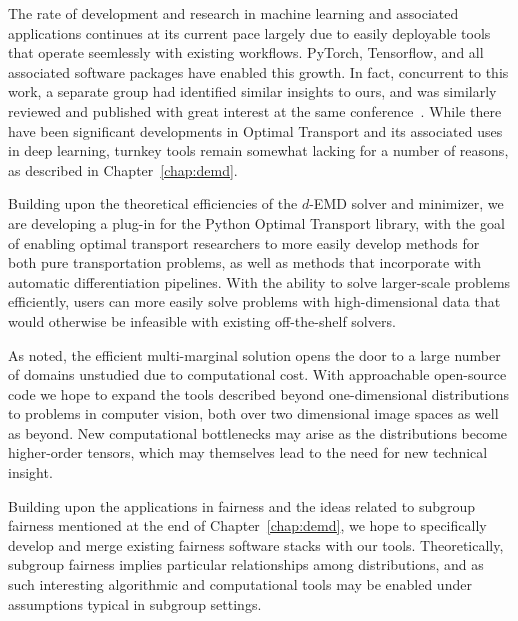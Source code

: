 The rate of development and research in machine learning and associated applications
continues at its current pace
largely due to 
easily deployable tools that
operate seemlessly with existing workflows.
PyTorch, Tensorflow, and all associated software
packages have enabled this growth.
In fact,
concurrent to this work,
a separate group had identified 
similar insights to ours,
and was similarly reviewed and published
with great interest at the same conference~\citep{just2023lava}.
While there have been significant 
developments in Optimal Transport
and its associated 
uses in deep learning,
turnkey tools remain somewhat lacking
for a number of reasons,
as described in Chapter~\ref{chap:demd}.

Building upon the theoretical
efficiencies of the $d$-EMD solver
and minimizer,
we are developing
a plug-in for the Python Optimal Transport library,
with the goal of enabling
optimal transport researchers to 
more easily develop methods
for both pure transportation problems,
as well as methods that incorporate
with automatic differentiation pipelines.
With the ability to solve larger-scale 
problems efficiently,
users can more easily solve 
problems with high-dimensional data
that would otherwise be infeasible
with existing off-the-shelf solvers.

As noted,
the efficient multi-marginal solution
opens the door to a large number 
of domains unstudied due to computational cost.
With approachable open-source code
we hope to expand the tools described
beyond one-dimensional distributions
to problems in computer vision,
both over two dimensional image spaces
as well as beyond.
New computational bottlenecks may arise
as the distributions become
higher-order tensors, which 
may themselves lead to 
the need for new technical
insight.

Building upon the applications in fairness
and the ideas related to subgroup fairness
mentioned at the end of Chapter~\ref{chap:demd},
we hope to specifically
develop and merge existing fairness
software stacks with our tools.
Theoretically, subgroup fairness implies
particular relationships among distributions,
and as such interesting algorithmic
and computational tools may be enabled
under assumptions typical in subgroup settings.


